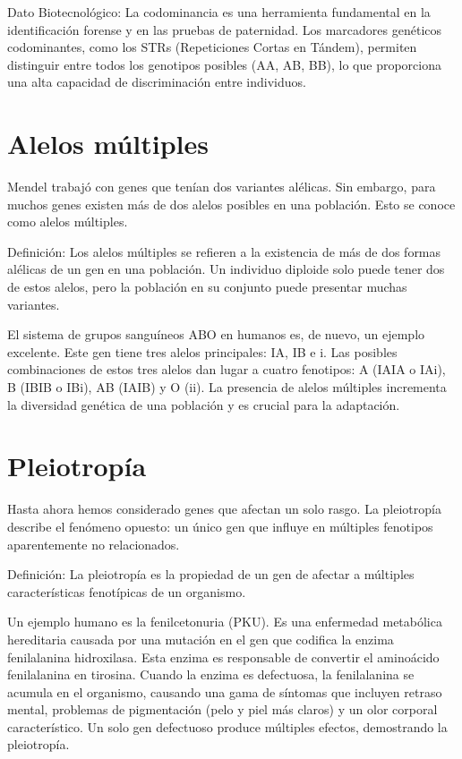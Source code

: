 Dato Biotecnológico: La codominancia es una herramienta fundamental en la identificación forense y en las pruebas de paternidad. Los marcadores genéticos codominantes, como los STRs (Repeticiones Cortas en Tándem), permiten distinguir entre todos los genotipos posibles (AA, AB, BB), lo que proporciona una alta capacidad de discriminación entre individuos.

\section{Alelos múltiples}

Mendel trabajó con genes que tenían dos variantes alélicas. Sin embargo, para muchos genes existen más de dos alelos posibles en una población. Esto se conoce como alelos múltiples.

Definición: Los alelos múltiples se refieren a la existencia de más de dos formas alélicas de un gen en una población. Un individuo diploide solo puede tener dos de estos alelos, pero la población en su conjunto puede presentar muchas variantes.

El sistema de grupos sanguíneos ABO en humanos es, de nuevo, un ejemplo excelente. Este gen tiene tres alelos principales: IA, IB e i. Las posibles combinaciones de estos tres alelos dan lugar a cuatro fenotipos: A (IAIA o IAi), B (IBIB o IBi), AB (IAIB) y O (ii). La presencia de alelos múltiples incrementa la diversidad genética de una población y es crucial para la adaptación.

\section{Pleiotropía}

Hasta ahora hemos considerado genes que afectan un solo rasgo. La pleiotropía describe el fenómeno opuesto: un único gen que influye en múltiples fenotipos aparentemente no relacionados.

Definición: La pleiotropía es la propiedad de un gen de afectar a múltiples características fenotípicas de un organismo.

Un ejemplo humano es la fenilcetonuria (PKU). Es una enfermedad metabólica hereditaria causada por una mutación en el gen que codifica la enzima fenilalanina hidroxilasa. Esta enzima es responsable de convertir el aminoácido fenilalanina en tirosina. Cuando la enzima es defectuosa, la fenilalanina se acumula en el organismo, causando una gama de síntomas que incluyen retraso mental, problemas de pigmentación (pelo y piel más claros) y un olor corporal característico. Un solo gen defectuoso produce múltiples efectos, demostrando la pleiotropía.

